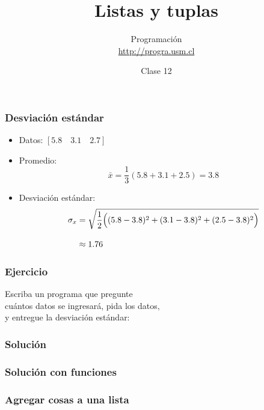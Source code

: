 \documentclass[12pt]{beamer}
\title{Listas y tuplas}
\author{
  Programación \\ \url{http://progra.usm.cl}
}
\date{Clase 12}
\begin{document}
  \begin{frame}
    \maketitle
  \end{frame}

  \begin{frame}
    \frametitle{Desviación estándar}
    \label{def-desviacion}
    \begin{itemize}
      \item Datos: \([5.8\quad 3.1\quad 2.7]\)
      \item Promedio:
        \[
          \bar{x} =
          \frac{1}{3}
          (5.8 + 3.1 + 2.5) = 3.8
        \]
      \item Desviación estándar:
        \begin{align*}
          \sigma_x &=
          \sqrt{
            \frac{1}{2}
            \Bigl(
              (5.8 - 3.8)^2 +
              (3.1 - 3.8)^2 +
              (2.5 - 3.8)^2
            \Bigr)
          } \\[2ex]
          &\approx 1.76
        \end{align*}
    \end{itemize}

  \end{frame}

  \begin{frame}
    \label{ejercicio-desviacion}
    \frametitle{Ejercicio}
    Escriba un programa que pregunte \\
    cuántos datos se ingresará, pida los datos, \\
    y entregue la desviación estándar:
    
  \end{frame}

  \begin{frame}
    \label{programa-desviacion}
    \frametitle{Solución}
    \footnotesize
    
  \end{frame}

  \begin{frame}
    \label{programa-desviacion-funciones}
    \frametitle{Solución con funciones}
    \tiny
    
  \end{frame}

  \begin{frame}
    \label{listas-agregar}
    \frametitle{Agregar cosas a una lista}
    
  \end{frame}
\end{document}
